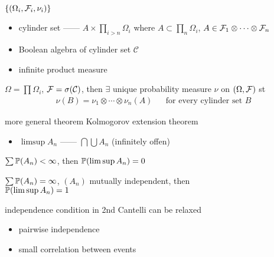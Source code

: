 \begin{setting}
    $\left\{ (\Omega_i, \mathcal{F}_i, \nu_i) \right\}$
\end{setting}

\begin{itemize}
    \item cylinder set ------ $A \times \prod_{i > n} \Omega_i$ where $A \subset \prod_{n} \Omega_i$, $A \in \mathcal{F}_1 \otimes \cdots \otimes \mathcal{F}_n$
    \item Boolean algebra of cylinder set $\mathcal{C}$
    \item infinite product measure
\end{itemize}

\begin{prop}
    $\Omega = \prod \Omega_i$, $\mathcal{F} = \sigma(\mathcal{C})$, then $\exists$ unique probability measure $\nu$ on $(\Omega, \mathcal{F})$ st
    \begin{align*}
        \nu(B) = \nu_1 \otimes \cdots \otimes \nu_n (A) && \text{for every cylinder set $B$}
    \end{align*}
\end{prop}

\begin{fact}
    more general theorem Kolmogorov extension theorem
\end{fact}

\begin{itemize}
    \item $\limsup A_n$ ------ $\bigcap \bigcup A_n$ (infinitely offen)
\end{itemize}

\begin{lemma}
    $\sum \mathbb{P}(A_n) < \infty$, then $\mathbb{P} (\limsup A_n) = 0$
\end{lemma}

\begin{lemma}
    $\sum \mathbb{P}(A_n) = \infty$, $(A_n)$ mutually independent, then \\
    $\mathbb{P} (\limsup A_n) = 1$
\end{lemma}

\begin{fact}
    independence condition in 2nd Cantelli can be relaxed
    \begin{itemize}
        \item pairwise independence
        \item small correlation between events
    \end{itemize}
\end{fact}